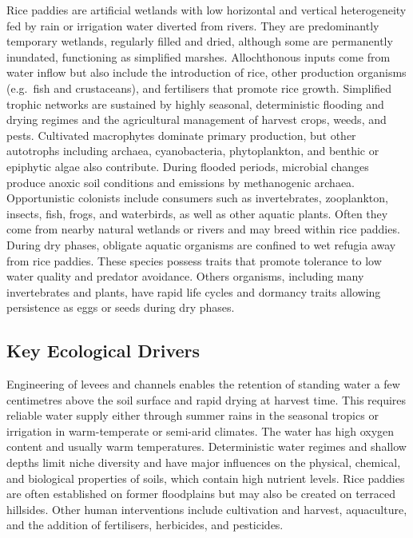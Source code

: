 \documentclass[
  letterpaper,
  DIV=11,
  numbers=noendperiod]{scrartcl}
\begin{document}
Rice paddies are artificial wetlands with low horizontal and vertical
heterogeneity fed by rain or irrigation water diverted from rivers. They
are predominantly temporary wetlands, regularly filled and dried,
although some are permanently inundated, functioning as simplified
marshes. Allochthonous inputs come from water inflow but also include
the introduction of rice, other production organisms (e.g.~fish and
crustaceans), and fertilisers that promote rice growth. Simplified
trophic networks are sustained by highly seasonal, deterministic
flooding and drying regimes and the agricultural management of harvest
crops, weeds, and pests. Cultivated macrophytes dominate primary
production, but other autotrophs including archaea, cyanobacteria,
phytoplankton, and benthic or epiphytic algae also contribute. During
flooded periods, microbial changes produce anoxic soil conditions and
emissions by methanogenic archaea. Opportunistic colonists include
consumers such as invertebrates, zooplankton, insects, fish, frogs, and
waterbirds, as well as other aquatic plants. Often they come from nearby
natural wetlands or rivers and may breed within rice paddies. During dry
phases, obligate aquatic organisms are confined to wet refugia away from
rice paddies. These species possess traits that promote tolerance to low
water quality and predator avoidance. Others organisms, including many
invertebrates and plants, have rapid life cycles and dormancy traits
allowing persistence as eggs or seeds during dry phases.

\subsection{Key Ecological Drivers}\label{key-ecological-drivers-19}

Engineering of levees and channels enables the retention of standing
water a few centimetres above the soil surface and rapid drying at
harvest time. This requires reliable water supply either through summer
rains in the seasonal tropics or irrigation in warm-temperate or
semi-arid climates. The water has high oxygen content and usually warm
temperatures. Deterministic water regimes and shallow depths limit niche
diversity and have major influences on the physical, chemical, and
biological properties of soils, which contain high nutrient levels. Rice
paddies are often established on former floodplains but may also be
created on terraced hillsides. Other human interventions include
cultivation and harvest, aquaculture, and the addition of fertilisers,
herbicides, and pesticides.
\end{document}
